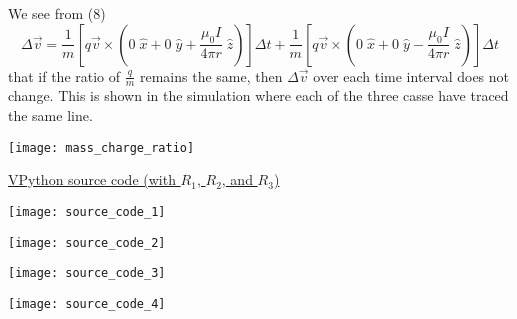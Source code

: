\documentclass[11pt]{article}
\begin{document}
\noindent We see from (8)
\[
\Delta\vec{v}=\frac{1}{m}\left[q\vec{v}\times\left(0\;\hat{x}+0\;\hat{y}+\frac{\mu_0I}{4\pi r}\;\hat{z}\right)\right]\Delta t + \frac{1}{m}\left[q\vec{v}\times\left(0\;\hat{x}+0\;\hat{y}-\frac{\mu_0I}{4\pi r}\;\hat{z}\right)\right]\Delta t
\]
\noindent that if the ratio of $\frac{q}{m}$ remains the same, then $\Delta\vec{v}$ over each time interval does not change. This is shown in the simulation where each of the three casse have traced the same line.
\vspace{.5in}

\begin{center}
\texttt{[image: mass\_charge\_ratio]}
\end{center}

\newpage

\begin{center}
\underline{VPython source code (with $R_1$, $R_2$, and $R_3$)}
\end{center}
\vspace{.3in}

\begin{center}
\texttt{[image: source\_code\_1]}
\end{center}
\begin{center}
\texttt{[image: source\_code\_2]}
\end{center}
\begin{center}
\texttt{[image: source\_code\_3]}
\end{center}
\begin{center}
\texttt{[image: source\_code\_4]}
\end{center}
\end{document}
